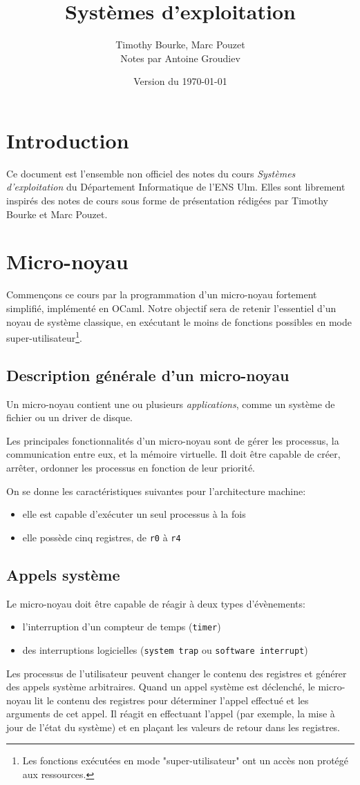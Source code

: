 \documentclass[french, toc]{../cs-classes/cs-classes}
\title{Systèmes d'exploitation}
\author{Timothy Bourke, Marc Pouzet\\ Notes par Antoine Groudiev}
\date{Version du \today}
\begin{document}
\newpage
\section*{Introduction}
Ce document est l'ensemble non officiel des notes du cours \emph{Systèmes d'exploitation} du Département Informatique de l'ENS Ulm. Elles sont librement inspirés des notes de cours sous forme de présentation rédigées par Timothy Bourke et Marc Pouzet.

\section{Micro-noyau}
Commençons ce cours par la programmation d'un micro-noyau fortement simplifié, implémenté en OCaml. Notre objectif sera de retenir l'essentiel d'un noyau de système classique, en exécutant le moins de fonctions possibles en mode super-utilisateur\footnote{Les fonctions exécutées en mode "super-utilisateur" ont un accès non protégé aux ressources.}.

\subsection{Description générale d'un micro-noyau}
Un micro-noyau contient une ou plusieurs \emph{applications}, comme un système de fichier ou un driver de disque.

Les principales fonctionnalités d'un micro-noyau sont de gérer les processus, la communication entre eux, et la mémoire virtuelle. Il doit être capable de créer, arrêter, ordonner les processus en fonction de leur priorité.

On se donne les caractéristiques suivantes pour l'architecture machine:
\begin{itemize}
    \item elle est capable d'exécuter un seul processus à la fois
    \item elle possède cinq registres, de \texttt{r0} à \texttt{r4}
\end{itemize}

\subsection{Appels système}
Le micro-noyau doit être capable de réagir à deux types d'évènements:
\begin{itemize}
    \item l'interruption d'un compteur de temps (\texttt{timer})
    \item des interruptions logicielles (\texttt{system trap} ou \texttt{software interrupt})
\end{itemize}
Les processus de l'utilisateur peuvent changer le contenu des registres et générer des appels système arbitraires. Quand un appel système est déclenché, le micro-noyau lit le contenu des registres pour déterminer l’appel effectué et les arguments de cet appel. Il réagit en effectuant l’appel (par exemple, la mise à jour de l’état du système) et en plaçant les valeurs de retour dans les registres.
\end{document}
